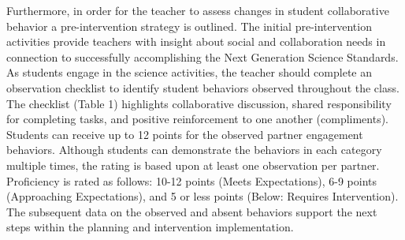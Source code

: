 \documentclass[11pt]{sig-alternate}
\begin{document}
\begin{large}
Furthermore, in order for the teacher to assess changes in student collaborative behavior a pre-intervention strategy is outlined. The initial pre-intervention activities provide teachers with insight about social and collaboration needs in connection to successfully accomplishing the Next Generation Science Standards. As students engage in the science activities, the teacher should complete an observation checklist to identify student behaviors observed throughout the class. The checklist (Table 1) highlights collaborative discussion, shared responsibility for completing tasks, and positive reinforcement to one another (compliments). Students can receive up to 12 points for the observed partner engagement behaviors. Although students can demonstrate the behaviors in each category multiple times, the rating is based upon at least one observation per partner. Proficiency is rated as follows: 10-12 points (Meets Expectations), 6-9 points (Approaching Expectations), and 5 or less points (Below: Requires Intervention). The subsequent data on the observed and absent behaviors support the next steps within the planning and intervention implementation.


\end{large}
\end{document}
